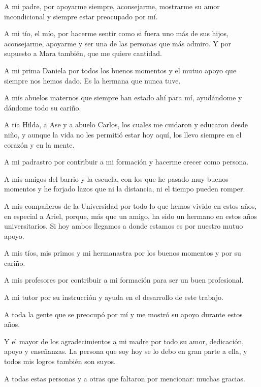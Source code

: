 \begin{acknowledgements}
    A mi padre, por apoyarme siempre, aconsejarme, mostrarme su amor incondicional y siempre estar preocupado por m\'i.
    
    A mi t\'io, el m\'io, por hacerme sentir como si fuera uno m\'as de sus hijos, aconsejarme, apoyarme y ser una de las personas que m\'as admiro. Y por supuesto a Mara tambi\'en, que me quiere cantidad.
    
    A mi prima Daniela por todos los buenos momentos y el mutuo apoyo que siempre nos hemos dado. Es la hermana que nunca tuve.
    
    A mis abuelos maternos que siempre han estado ah\'i para m\'i, ayud\'andome y d\'andome todo su cari\~no.
    
    A t\'ia Hilda, a Ase y a abuelo Carlos, los cuales me cuidaron y educaron desde ni\~no, y aunque la vida no les permiti\'o estar hoy aqu\'i, los llevo siempre en el coraz\'on y en la mente.
    
    A mi padrastro por contribuir a mi formaci\'on y hacerme crecer como persona.
    
    A mis amigos del barrio y la escuela, con los que he pasado muy buenos momentos y he forjado lazos que ni la distancia, ni el tiempo pueden romper.
    
    A mis compa\~neros de la Universidad por todo lo que hemos vivido en estos a\~nos, en especial a Ariel, porque, m\'as que un amigo, ha sido un hermano en estos a\~nos universitarios. Si hoy ambos llegamos a donde estamos es por nuestro mutuo apoyo.
    
    A mis t\'ios, mis primos y mi hermanastra por los buenos momentos y por su cari\~no.
    
    A mis profesores por contribuir a mi formaci\'on para ser un buen profesional.
    
    A mi tutor por su instrucci\'on y ayuda en el desarrollo de este trabajo.
    
    A toda la gente que se preocup\'o por m\'i y me mostr\'o su apoyo durante estos a\~nos.
    
    Y el mayor de los agradecimientos a mi madre por todo su amor, dedicaci\'on, apoyo y ense\~nanzas. La persona que soy hoy se lo debo en gran parte a ella, y todos mis logros tambi\'en son suyos.
    
    A todas estas personas y a otras que faltaron por mencionar: muchas gracias.   
\end{acknowledgements}